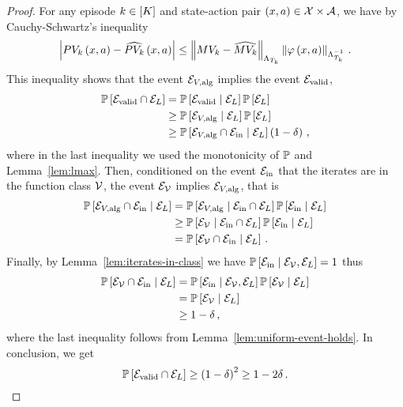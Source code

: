 \begin{proof}
    For any episode $k \in \sbr{K}$ and state-action pair $\spr{x, a} \in \cX \times \cA$, we have by Cauchy-Schwartz's inequality
    \begin{equation*}
        \abs{P V_k \spr{x, a} - \wh{P V_k} \spr{x, a}} \leq \norm{M V_k - \wh{M V_k}}_{\Lambda_{T_k}} \norm{\phi \spr{x, a}}_{\Lambda_{T_k}^{-1}}\,.
    \end{equation*}
    This inequality shows that the event $\cE_{V, \mathrm{alg}}$ implies the event $\cE_{\mathrm{valid}}$, \ie
    \begin{align*}
        \bbP \sbr{\cE_{\mathrm{valid}} \cap \cE_L} &= \bbP \sbr{\cE_{\mathrm{valid}} \given \cE_L} \bbP \sbr{\cE_L} \\
        &\geq \bbP \sbr{\cE_{V, \mathrm{alg}} \given \cE_L} \bbP \sbr{\cE_L} \\
        &\geq \bbP \sbr{\cE_{V, \mathrm{alg}} \cap \cE_{\mathrm{in}} \given \cE_L} \spr{1 - \delta}\,,
    \end{align*}
    where in the last inequality we used the monotonicity of $\bbP$ and Lemma~\ref{lem:lmax}. Then, conditioned on the event $\cE_{\mathrm{in}}$ that the iterates are in the function class $\cV$, the event $\cE_\cV$ implies $\cE_{V, \mathrm{alg}}$, that is
    \begin{align*}
        \bbP \sbr{\cE_{V, \mathrm{alg}} \cap \cE_{\mathrm{in}} \given \cE_L} &= \bbP \sbr{\cE_{V, \mathrm{alg}} \given \cE_{\mathrm{in}} \cap \cE_L} \bbP \sbr{\cE_{\mathrm{in}} \given \cE_L} \\
        &\geq \bbP \sbr{\cE_\cV \given \cE_{\mathrm{in}} \cap \cE_L} \bbP \sbr{\cE_{\mathrm{in}} \given \cE_L} \\
        &= \bbP \sbr{\cE_\cV \cap \cE_{\mathrm{in}} \given \cE_L}\,.
    \end{align*}
    Finally, by Lemma~\ref{lem:iterates-in-class} we have $\bbP \sbr{\cE_{\mathrm{in}} \given \cE_\cV, \cE_L} = 1$ thus
    \begin{align*}
        \bbP \sbr{\cE_\cV \cap \cE_{\mathrm{in}} \given \cE_L} &= \bbP \sbr{\cE_{\mathrm{in}} \given \cE_\cV, \cE_L} \bbP \sbr{\cE_\cV \given \cE_L} \\
        &= \bbP \sbr{\cE_\cV \given \cE_L} \\
        &\geq 1 - \delta\,,
    \end{align*}
    where the last inequality follows from Lemma~\ref{lem:uniform-event-holds}. In conclusion, we get
    \begin{equation*}
        \bbP \sbr{\cE_{\mathrm{valid}} \cap \cE_L} \geq \spr{1 - \delta}^2 \geq 1 - 2 \delta\,.
    \end{equation*}
\end{proof}


